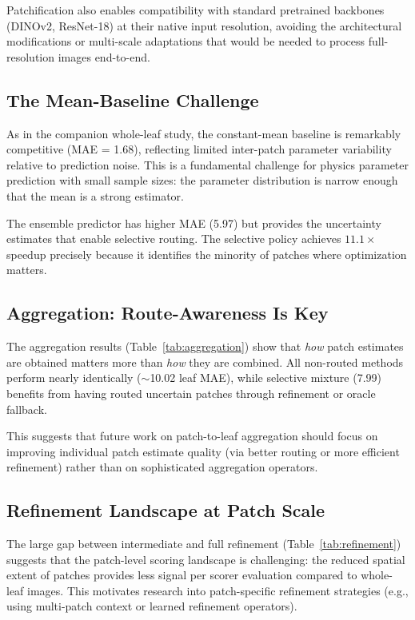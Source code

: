\documentclass[11pt,a4paper]{article}
\begin{document}
Patchification also enables compatibility with standard pretrained backbones
(DINOv2, ResNet-18) at their native input resolution, avoiding the
architectural modifications or multi-scale adaptations that would be needed
to process full-resolution images end-to-end.

\subsection{The Mean-Baseline Challenge}

As in the companion whole-leaf study, the constant-mean baseline is
remarkably competitive (MAE = 1.68), reflecting limited inter-patch
parameter variability relative to prediction noise.
This is a fundamental challenge for physics parameter prediction with
small sample sizes: the parameter distribution is narrow enough that
the mean is a strong estimator.

The ensemble predictor has higher MAE (5.97) but provides the uncertainty
estimates that enable selective routing. The selective policy achieves
$11.1{\times}$ speedup precisely because it identifies the minority of
patches where optimization matters.

\subsection{Aggregation: Route-Awareness Is Key}

The aggregation results (Table~\ref{tab:aggregation}) show that
\emph{how} patch estimates are obtained matters more than \emph{how}
they are combined. All non-routed methods perform nearly identically
(${\sim}$10.02 leaf MAE), while selective mixture (7.99) benefits from
having routed uncertain patches through refinement or oracle fallback.

This suggests that future work on patch-to-leaf aggregation should focus
on improving individual patch estimate quality (via better routing or
more efficient refinement) rather than on sophisticated aggregation operators.

\subsection{Refinement Landscape at Patch Scale}

The large gap between intermediate and full refinement (Table~\ref{tab:refinement})
suggests that the patch-level scoring landscape is challenging:
the reduced spatial extent of patches provides less signal per scorer
evaluation compared to whole-leaf images. This motivates research into
patch-specific refinement strategies (e.g., using multi-patch context
or learned refinement operators).
\end{document}

